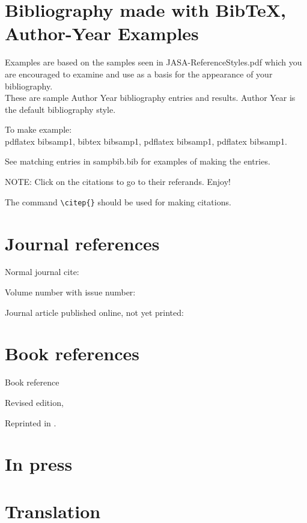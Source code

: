 \documentclass[preprint]{JASAnew}
\begin{document}
\section*{Bibliography made with BibTeX, Author-Year Examples}

Examples are based on the samples seen in JASA-ReferenceStyles.pdf which you
are encouraged to examine and use as a basis for the appearance of
your bibliography.\\
These are sample Author Year bibliography entries and results.
Author Year is the default bibliography style.

To make example:\\
 pdflatex bibsamp1, bibtex bibsamp1, pdflatex bibsamp1, pdflatex
 bibsamp1.

 See matching entries in sampbib.bib for examples of making the entries.

NOTE: Click on the citations to go to their referands. Enjoy!

The command \verb+\citep{}+ should be used for making citations.


\section*{Journal references}

Normal journal cite: \citep{joursamp1}

Volume number with issue number: \citep{joursamp3}


Journal article published online, not yet printed: \citep[published
online]{sampMisc2}

\section*{Book references}

Book reference \citep{booksamp1}

Revised edition, \citep{booksamp4}

Reprinted in \citep{sampReprint2}.

\section*{In press}

\citep[in press]{inpress2}

\citep[in press]{inpress3}


\section*{Translation}
\end{document}
